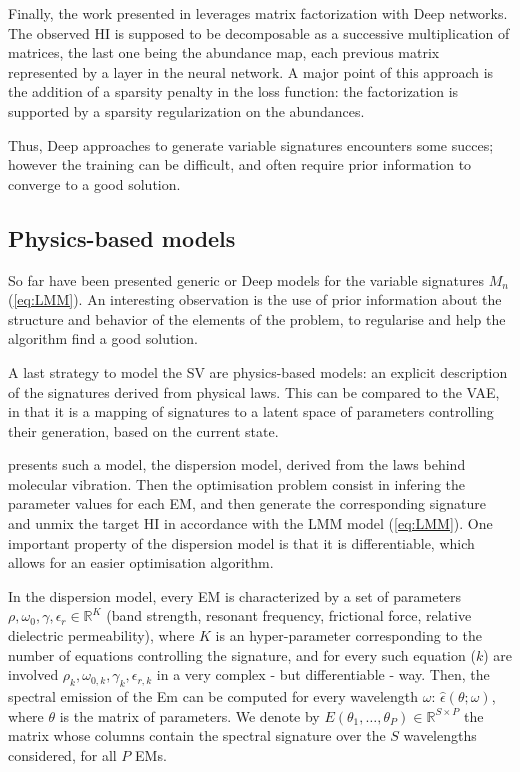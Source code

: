 \documentclass{article}
\begin{document}
Finally, the work presented in \citet{feng_hyperspectral_2018} leverages matrix factorization with Deep networks. The observed HI is supposed to be decomposable as a successive multiplication of matrices, the last one being the abundance map, each previous matrix represented by a layer in the neural network. A major point of this approach is the addition of a sparsity penalty in the loss function: the factorization is supported by a sparsity regularization on the abundances.

Thus, Deep approaches to generate variable signatures encounters some succes; however the training can be difficult, and often require prior information to converge to a good solution.

\subsection{Physics-based models}\label{sec:dispersion}
So far have been presented generic or Deep models for the variable signatures $M_n$ (\ref{eq:LMM}). An interesting observation is the use of prior information about the structure and behavior of the elements of the problem, to regularise and help the algorithm find a good solution.

A last strategy to model the SV are physics-based models: an explicit description of the signatures derived from physical laws. This can be compared to the VAE, in that it is a mapping of signatures to a latent space of parameters controlling their generation, based on the current state.

\citet{janiczek_differentiable_2020} presents such a model, the dispersion model, derived from the laws behind molecular vibration. Then the optimisation problem consist in infering the parameter values for each EM, and then generate the corresponding signature and unmix the target HI in accordance with the LMM model (\ref{eq:LMM}). One important property of the dispersion model is that it is differentiable, which allows for an easier optimisation algorithm.

In the dispersion model, every EM is characterized by a set of parameters $\rho, \omega_0, \gamma, \epsilon_r \in \mathbb{R}^K$ (band strength, resonant frequency, frictional force, relative dielectric permeability), where $K$ is an hyper-parameter corresponding to the number of equations controlling the signature, and for every such equation ($k$) are involved $\rho_k, \omega_{0, k}, \gamma_k, \epsilon_{r, k}$ in a very complex - but differentiable - way. Then, the spectral emission of the Em can be computed for every wavelength $\omega$: $\widehat\epsilon(\theta; \omega)$, where $\theta$ is the matrix of parameters. We denote by $E(\theta_1, \dots, \theta_P) \in \mathbb{R}^{S \times P}$ the matrix whose columns contain the spectral signature over the $S$ wavelengths considered, for all $P$ EMs.
\end{document}

